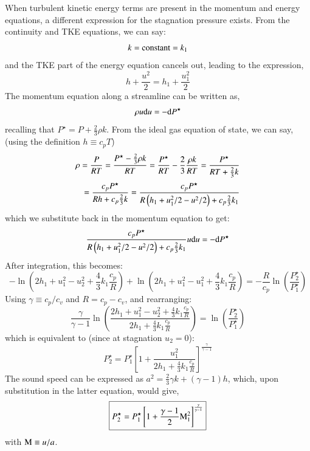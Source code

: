 \documentclass{warpdoc}
\numberwithin{equation}{section}
\newcommand{\alb}{\vspace{0.2cm}\\} %
\newcommand{\Cv}{{c_{v}}}
\newcommand{\Cp}{{c_{p}}}
\newcommand{\mfd}{\displaystyle}
\newcommand{\ordi}{{\rm d}}
\newcommand{\bigfrac}{\mfd\frac}
\newcommand\frameeqn[1]{\fbox{$#1$}}
\begin{document}
When turbulent kinetic energy terms are present in the momentum and
energy equations, a different expression for the stagnation pressure
exists. From the continuity and TKE equations, we can say:
%
\begin{equation}
  k={\rm constant}=k_1
\end{equation}
%
and the TKE part of the energy equation cancels out, leading to the
expression,
%
\begin{equation}
  h + \bigfrac{u^2}{2} = h_1 + \bigfrac{u_1^2}{2}
\end{equation}
%
The momentum equation along a streamline can be written as,
%
\begin{equation}
  \rho u \ordi u =-\ordi P^\star
\end{equation}
%
recalling that $P^\star=P+\frac{2}{3}\rho k$.
From the ideal gas equation of state, we can say, (using the definition
$h\equiv \Cp T$)
%
\begin{equation}
 \begin{array}{r}
  \rho=\bigfrac{P}{RT}
      =\bigfrac{P^\star-\frac{2}{3}\rho k}{RT}
      = \frac{P^\star}{RT} - \frac{2}{3} \frac{\rho k}{R T}
      = \frac{P^\star}{RT+\frac{2}{3}k} \alb
      = \bigfrac{\Cp P^\star}{Rh+\Cp\frac{2}{3}k}
      = \frac{\Cp P^\star}{R\left(h_1+u_1^2/2-u^2/2\right)+\Cp\frac{2}{3}k_1}
 \end{array}
\end{equation}
%
which we substitute back in the momentum equation to get:
%
\begin{equation}
  \frac{\Cp P^\star}{R\left(h_1+u_1^2/2-u^2/2\right)+\Cp\frac{2}{3}k_1}  u \ordi u =-\ordi P^\star
\end{equation}
%
After integration, this becomes:
%
\begin{equation}
  -\ln \left(2 h_1+u_1^2-u_2^2+\frac{4}{3}k_1 \frac{\Cp}{R}\right)
  +\ln \left(2 h_1+u_1^2-u_1^2+\frac{4}{3}k_1 \frac{\Cp}{R}\right)
  = - \frac{R}{\Cp}\ln \left(\frac{P_2^\star}{P_1^\star}\right)
\end{equation}
%
Using $\gamma \equiv \Cp/\Cv$ and $R=\Cp-\Cv$, and rearranging:
%
\begin{equation}
\frac{\gamma}{\gamma-1} \ln \left( \frac{2 h_1+u_1^2-u_2^2+\frac{4}{3}k_1 \frac{\Cp}{R}}
                                 {2 h_1+\frac{4}{3}k_1 \frac{\Cp}{R}} \right)
  =  \ln \left(\frac{P_2^\star}{P_1^\star}\right)
\end{equation}
%
which is equivalent to (since at stagnation $u_2=0$):
%
\begin{equation}
P_2^\star
=
 P_1^\star \left[ 1+ \frac{u_1^2}{2 h_1+\frac{4}{3}k_1 \frac{\Cp}{R}} \right]
^\frac{\gamma}{\gamma-1}
\end{equation}
%
The sound speed can be expressed as $a^2=\frac{2}{3}\gamma k+(\gamma-1) h$, which,
upon substitution in the latter equation, would give,
%
\begin{equation}
\frameeqn{
\mfd P_2^\star
=
 P_1^\star \left[ 1+ \frac{\gamma-1}{2} {\rm M}_1^2 \right]
^\frac{\gamma}{\gamma-1}
}
\end{equation}
%
with ${\rm M} \equiv u/a$.
\end{document}
